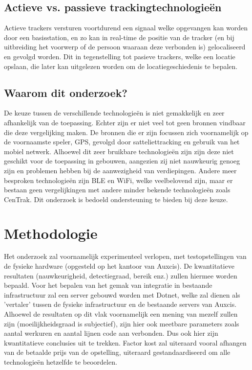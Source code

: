 \subsection{Actieve vs. passieve trackingtechnologieën}

Actieve trackers versturen voortdurend een signaal welke opgevangen kan worden door een basisstation, en zo kan in real-time de positie van de tracker (en bij uitbreiding het voorwerp of de persoon waaraan deze verbonden is) gelocaliseerd en gevolgd worden.
Dit in tegenstelling tot pasieve trackers, welke een locatie opslaan, die later kan uitgelezen worden om de locatiegeschiedenis te bepalen. \autocite{Rosenfeld2017}

\subsection{Waarom dit onderzoek?}
De keuze tussen de verschillende technologieën is niet gemakkelijk en zeer afhankelijk van de toepassing. Echter zijn er niet veel tot geen bronnen vindbaar die deze vergelijking maken. De bronnen die er zijn focussen zich voornamelijk op de voornaamste speler, GPS, gevolgd door satteliettracking en gebruik van het mobiel netwerk. Alhoewel dit zeer bruikbare technologieën zijn zijn deze niet geschikt voor de toepassing in gebouwen, aangezien zij niet nauwkeurig genoeg zijn en problemen hebben bij de aanwezigheid van verdiepingen. Andere meer besproken technologieën zijn BLE en WiFi, welke veelbelovend zijn, maar er bestaan geen vergelijkingen met andere minder bekende technologieën zoals CenTrak. Dit onderzoek is bedoeld ondersteuning te bieden bij deze keuze. \autocite{Deloitte2021} \autocite{Nijhawan2021}

\section{Methodologie}
\label{sec:methodologie}

Het onderzoek zal voornamelijk experimenteel verlopen, met testopstellingen van de fysieke hardware (opgesteld op het kantoor van Auxcis). De kwantitatieve resultaten (nauwkeurigheid, detectiegraad, bereik enz.) zullen hiermee worden bepaald. Voor het bepalen van het gemak van integratie in bestaande infrastructuur zal een server gebouwd worden met Dotnet, welke zal dienen als 'vertaler' tussen de fysieke infrastructuur en de bestaande servers van Auxcis. Alhoewel de resultaten op dit vlak voornamelijk een mening van mezelf zullen zijn (moeilijkheidsgraad is subjectief), zijn hier ook meetbare parameters zoals aantal werkuren en aantal lijnen code aan verbonden. Dus ook hier zijn kwantitatieve conclusies uit te trekken. Factor kost zal uiteraard vooral afhangen van de betaalde prijs van de opstelling, uiteraard gestandaardiseerd om alle technologieën hetzelfde te beoordelen.

